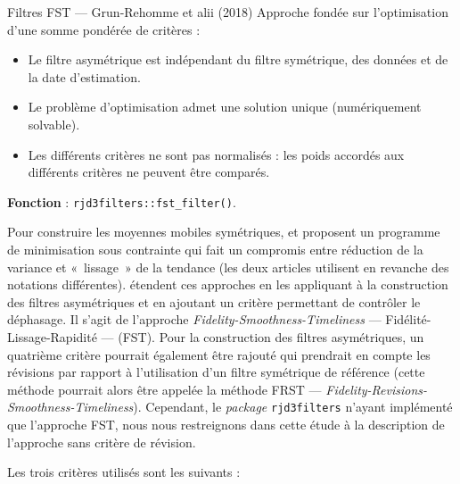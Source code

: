 \documentclass[
  12pt,
  a4paper,french]{article}
\newcommand\1{\mathds{1}}
\begin{document}
\begin{summary_box}{Filtres FST --- Grun-Rehomme et alii (2018)}
Approche fondée sur l'optimisation d'une somme pondérée de critères :

\begin{itemize}
\item
  Le filtre asymétrique est indépendant du filtre symétrique, des données et de la date d'estimation.
\item
  Le problème d'optimisation admet une solution unique (numériquement solvable).
\item
  Les différents critères ne sont pas normalisés : les poids accordés aux différents critères ne peuvent être comparés.
\end{itemize}

\textbf{Fonction } : \texttt{rjd3filters::fst\_filter()}.

\end{summary_box}

Pour construire les moyennes mobiles symétriques, \textcite{GrunRehommeLadiray1994} et \textcite{GrayThomson1996} proposent un programme de minimisation sous contrainte qui fait un compromis entre réduction de la variance et «~lissage~» de la tendance (les deux articles utilisent en revanche des notations différentes).
\textcite{ch15HBSA} étendent ces approches en les appliquant à la construction des filtres asymétriques et en ajoutant un critère permettant de contrôler le déphasage.
Il s'agit de l'approche \emph{Fidelity-Smoothness-Timeliness} --- Fidélité-Lissage-Rapidité --- (FST).
Pour la construction des filtres asymétriques, un quatrième critère pourrait également être rajouté qui prendrait en compte les révisions par rapport à l'utilisation d'un filtre symétrique de référence (cette méthode pourrait alors être appelée la méthode FRST --- \emph{Fidelity-Revisions-Smoothness-Timeliness}).
Cependant, le \emph{package} \texttt{rjd3filters} n'ayant implémenté que l'approche FST, nous nous restreignons dans cette étude à la description de l'approche sans critère de révision.

Les trois critères utilisés sont les suivants :
\end{document}
